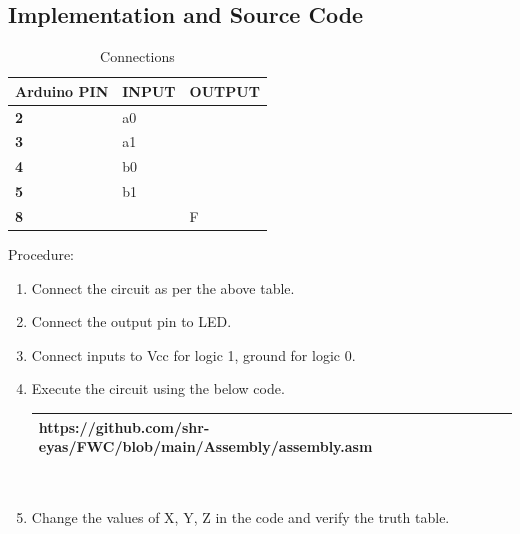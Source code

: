 \documentclass[journal,10pt]{article}
\begin{document}
\subsection{Implementation and Source Code}
\begin{table}[!h]
\begin{center}
  \begin{tabularx}{0.46\textwidth} { 
  | >{\centering\arraybackslash}X 
  | >{\centering\arraybackslash}X 
  | >{\centering\arraybackslash}X  | }
\hline
\textbf{Arduino PIN} & \textbf{INPUT} & \textbf{OUTPUT} \\ 
\hline
\textbf 2 & a0 & \\
\hline
\textbf 3 & a1 & \\
\hline
\textbf 4 & b0 & \\
\hline
\textbf 5 & b1 & \\
\hline
\textbf 8 & & F \\
\hline
\end{tabularx}
\caption{\label{table:8}Connections}
\end{center}
\end{table}

\begin{flushleft}

Procedure:\\
\begin{enumerate}[label=\alph*.,labelindent=\parindent,leftmargin=*]
    \item Connect the circuit as per the above table.
    \vspace{2pt}
    \item Connect the output pin to LED.
    \vspace{2pt}
    \item Connect inputs to Vcc for logic 1, ground for logic 0.
    \vspace{2pt}
    \item Execute the circuit using the below code.
    \\
    \vspace{7pt}
    \begin{tabularx}{0.8\textwidth} { 
    | >{\centering\arraybackslash}X |}
    \hline
    https://github.com/shr-eyas/FWC/blob/main/Assembly/assembly.asm\\
    \hline
    \end{tabularx}
    \\
    \vspace{10pt}
    \item Change the values of X, Y, Z in the code and verify the truth table.\\
    
\end{enumerate}
\end{flushleft}
\end{document}
